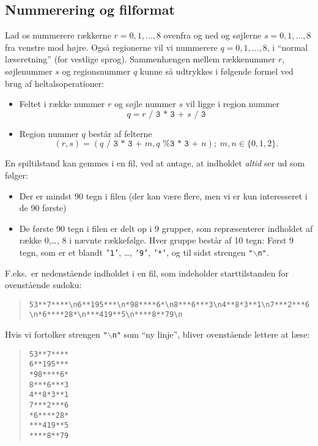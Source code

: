 \subsection*{Nummerering og filformat}
Lad os nummerere r{\ae}kkerne $r = 0, 1, \ldots, 8$ ovenfra og ned og s{\o}jlerne $s=0, 1, \ldots, 8$ fra venstre mod h{\o}jre.  Ogs{\aa} regionerne vil vi nummerere $q=0, 1, \ldots, 8$, i ``normal l{\ae}seretning'' (for vestlige sprog).  Sammenh{\ae}ngen mellem r{\ae}kkenummer $r$, s{\o}jlenummer $s$ og regionsnummer $q$ kunne s{\aa} udtrykkes i f{\o}lgende formel ved brug af heltalsoperationer: 
\begin{itemize}
\item Feltet i r{\ae}kke nummer $r$ og s{\o}jle nummer $s$ vil ligge i region nummer
  \begin{equation}
    q = \texttt{$r$ / 3 * 3 + $s$ / 3}
    \label{eq:1}
  \end{equation}
\item Region nummer $q$ best{\aa}r af felterne
  \begin{equation}
    (r,s)=\left(q\texttt{ / 3 * 3 + }m, q\texttt{ \% 3 * 3 + }n\right);\; m,n\in\{0,1,2\}.
    \label{eq:2}
  \end{equation}
\end{itemize}
En spiltilstand kan gemmes i en fil, ved at antage, at indholdet \emph{altid} ser ud som f{\o}lger:
\begin{itemize}
\item Der er mindst 90 tegn i filen (der kan v{\ae}re flere, men vi er kun interesseret i de 90 f{\o}rste)
\item De f{\o}rste 90 tegn i filen er delt op i 9 grupper, som repræsenterer indholdet af række 0,\dots, 8 i nævnte rækkefølge. Hver gruppe best{\aa}r af 10 tegn: F{\o}rst 9 tegn, som er et blandt \texttt{'1'}, \ldots, \texttt{'9'}, \texttt{'*'}, og til sidst strengen \texttt{"$\backslash$n"}.
\end{itemize}
F.eks.\ er nedenst{\aa}ende indholdet i en fil, som indeholder starttilstanden for ovenst{\aa}ende sudoku:
\begin{quote}
  {\scriptsize \verb|53**7****\n6**195***\n*98****6*\n8***6***3\n4**8*3**1\n7***2***6\n*6****28*\n***419**5\n****8**79\n|}
\end{quote}
Hvis vi fortolker strengen \texttt{"$\backslash$n"} som ``ny linje'', bliver ovenst{\aa}ende lettere at l{\ae}se:
\begin{quote}
\begin{verbatim}
53**7****
6**195***
*98****6*
8***6***3
4**8*3**1
7***2***6
*6****28*
***419**5
****8**79
\end{verbatim}
\end{quote}
